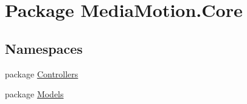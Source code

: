 \hypertarget{namespace_media_motion_1_1_core}{\section{Package Media\+Motion.\+Core}
\label{namespace_media_motion_1_1_core}
}
\subsection*{Namespaces}
\begin{DoxyCompactItemize}
\item 
package \hyperlink{namespace_media_motion_1_1_core_1_1_controllers}{Controllers}
\item 
package \hyperlink{namespace_media_motion_1_1_core_1_1_models}{Models}
\end{DoxyCompactItemize}
